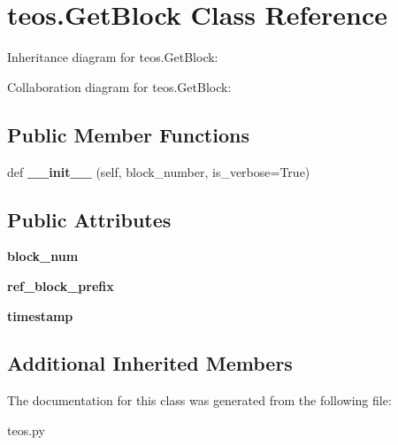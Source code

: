 \hypertarget{classteos_1_1GetBlock}{}\section{teos.\+Get\+Block Class Reference}
\label{classteos_1_1GetBlock}


Inheritance diagram for teos.\+Get\+Block\+:


Collaboration diagram for teos.\+Get\+Block\+:
\subsection*{Public Member Functions}
\begin{DoxyCompactItemize}
\item 
\mbox{\label{classteos_1_1GetBlock_a68fe9917d1398cf656e2449c92413c22}} 
def {\bfseries \+\_\+\+\_\+init\+\_\+\+\_\+} (self, block\+\_\+number, is\+\_\+verbose=True)
\end{DoxyCompactItemize}
\subsection*{Public Attributes}
\begin{DoxyCompactItemize}
\item 
\mbox{\label{classteos_1_1GetBlock_ae1d8164f9266931760f99d7bb9836d13}} 
{\bfseries block\+\_\+num}
\item 
\mbox{\label{classteos_1_1GetBlock_a22d40704171b417c7b80a6c0893d7daf}} 
{\bfseries ref\+\_\+block\+\_\+prefix}
\item 
\mbox{\label{classteos_1_1GetBlock_a1ea2d6759351799c0343f4027d17a870}} 
{\bfseries timestamp}
\end{DoxyCompactItemize}
\subsection*{Additional Inherited Members}


The documentation for this class was generated from the following file\+:\begin{DoxyCompactItemize}
\item 
teos.\+py\end{DoxyCompactItemize}
